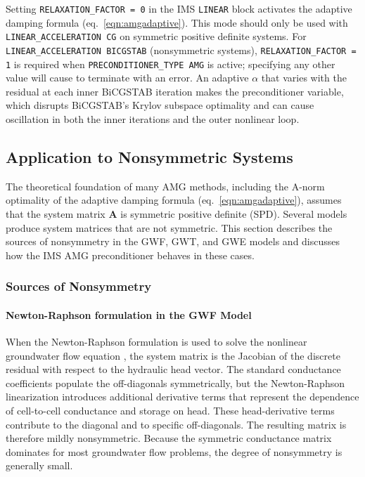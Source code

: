 Setting \texttt{RELAXATION\_FACTOR = 0} in the IMS \texttt{LINEAR} block activates the adaptive damping formula (eq.~\ref{eqn:amgadaptive}). This mode should only be used with \texttt{LINEAR\_ACCELERATION CG} on symmetric positive definite systems. For \texttt{LINEAR\_ACCELERATION BICGSTAB} (nonsymmetric systems), \texttt{RELAXATION\_FACTOR = 1} is required when \texttt{PRECONDITIONER\_TYPE AMG} is active; specifying any other value will cause \mf to terminate with an error. An adaptive $\alpha$ that varies with the residual at each inner BiCGSTAB iteration makes the preconditioner variable, which disrupts BiCGSTAB's Krylov subspace optimality and can cause oscillation in both the inner iterations and the outer nonlinear loop.


\subsection{Application to Nonsymmetric Systems}

The theoretical foundation of many AMG methods, including the A-norm optimality of the adaptive damping formula (eq.~\ref{eqn:amgadaptive}), assumes that the system matrix $\mathbf{A}$ is symmetric positive definite (SPD). Several \mf models produce system matrices that are not symmetric. This section describes the sources of nonsymmetry in the \mf GWF, GWT, and GWE models and discusses how the IMS AMG preconditioner behaves in these cases.

\subsubsection{Sources of Nonsymmetry}

\paragraph{Newton-Raphson formulation in the GWF Model}
When the Newton-Raphson formulation is used to solve the nonlinear groundwater flow equation \citep{modflow6gwf}, the system matrix is the Jacobian of the discrete residual with respect to the hydraulic head vector. The standard conductance coefficients populate the off-diagonals symmetrically, but the Newton-Raphson linearization introduces additional derivative terms that represent the dependence of cell-to-cell conductance and storage on head. These head-derivative terms contribute to the diagonal and to specific off-diagonals. The resulting matrix is therefore mildly nonsymmetric. Because the symmetric conductance matrix dominates for most groundwater flow problems, the degree of nonsymmetry is generally small.

